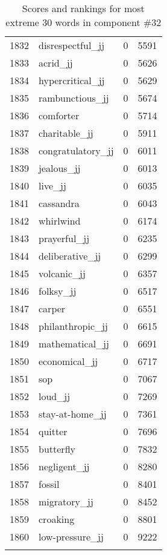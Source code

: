 \begin{longtable}[!htbp]{| rlr@{.}l |}
    1832 & disrespectful\_jj & 0 & 5591 \\
    1833 & acrid\_jj & 0 & 5626 \\
    1834 & hypercritical\_jj & 0 & 5629 \\
    1835 & rambunctious\_jj & 0 & 5674 \\
    1836 & comforter & 0 & 5714 \\
    1837 & charitable\_jj & 0 & 5911 \\
    1838 & congratulatory\_jj & 0 & 6011 \\
    1839 & jealous\_jj & 0 & 6013 \\
    1840 & live\_jj & 0 & 6035 \\
    1841 & cassandra & 0 & 6043 \\
    1842 & whirlwind & 0 & 6174 \\
    1843 & prayerful\_jj & 0 & 6235 \\
    1844 & deliberative\_jj & 0 & 6299 \\
    1845 & volcanic\_jj & 0 & 6357 \\
    1846 & folksy\_jj & 0 & 6517 \\
    1847 & carper & 0 & 6551 \\
    1848 & philanthropic\_jj & 0 & 6615 \\
    1849 & mathematical\_jj & 0 & 6691 \\
    1850 & economical\_jj & 0 & 6717 \\
    1851 & sop & 0 & 7067 \\
    1852 & loud\_jj & 0 & 7269 \\
    1853 & stay-at-home\_jj & 0 & 7361 \\
    1854 & quitter & 0 & 7696 \\
    1855 & butterfly & 0 & 7832 \\
    1856 & negligent\_jj & 0 & 8280 \\
    1857 & fossil & 0 & 8401 \\
    1858 & migratory\_jj & 0 & 8452 \\
    1859 & croaking & 0 & 8801 \\
    1860 & low-pressure\_jj & 0 & 9222 \\
    \hline
    \caption{Scores and rankings for most extreme 30 words in component \#32} \\
\end{longtable}
